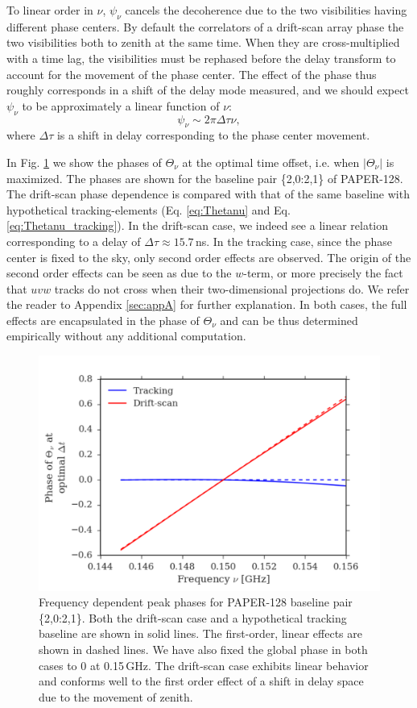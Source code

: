 \documentclass[twocolumn,apj,numberedappendix]{emulateapj}
\renewcommand\[{\begin{equation}}
\renewcommand\]{\end{equation}}
\begin{document}
To linear order in $\nu$, $\psi_\nu$ cancels the decoherence due to the two visibilities having different phase centers. By default the correlators of a drift-scan array phase the two visibilities both to zenith at the same time. When they are cross-multiplied with a time lag, the visibilities must be rephased before the delay transform to account for the movement of the phase center. The effect of the phase thus roughly corresponds in a shift of the delay mode measured, and we should expect $\psi_{\nu}$ to be approximately a linear function of $\nu$:
\[
\psi_{\nu}\sim 2\pi\Delta\tau\nu,
\]
where $\Delta\tau$ is a shift in delay corresponding to the phase center movement. 

In Fig. \ref{fig:phi_nu} we show the phases of $\Theta_\nu$ at the optimal time offset, i.e. when $|\Theta_\nu|$ is maximized. The phases are shown for the baseline pair \{2,0:2,1\} of PAPER-128. The drift-scan phase dependence is compared with that of the same baseline with hypothetical tracking-elements (Eq. \eqref{eq:Thetanu} and Eq. \eqref{eq:Thetanu_tracking}). In the drift-scan case, we indeed see a linear relation corresponding to a delay of $\Delta\tau\approx15.7$\,ns. In the tracking case, since the phase center is fixed to the sky, only second order effects are observed. The origin of the second order effects can be seen as due to the $w$-term, or more precisely the fact that $uvw$ tracks do not cross when their two-dimensional projections do. We refer the reader to Appendix \ref{sec:appA} for further explanation. In both cases, the full effects are encapsulated in the phase of $\Theta_\nu$ and can be thus determined empirically without any additional computation. 

\begin{figure}[H]
\includegraphics[width=1\linewidth]{phi_nu}

\caption{Frequency dependent peak phases for PAPER-128 baseline pair \{2,0:2,1\}. Both the drift-scan case and a hypothetical tracking baseline are shown in solid lines. The first-order, linear effects are shown in dashed lines. We have also fixed the global phase in both cases to 0 at 0.15\,GHz. The drift-scan case exhibits linear behavior and conforms well to the first order effect of a shift in delay space due to the movement of zenith. }
\label{fig:phi_nu}
\end{figure}
\end{document}
